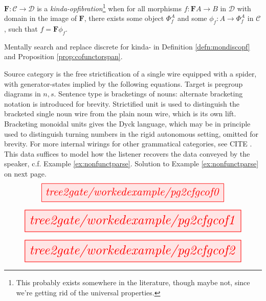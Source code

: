 \begin{defn}\label{defn:discopf}
$\mathbf{F}: \mathcal{C} \rightarrow \mathcal{D}$ is a \emph{kinda-opfibration}\footnote{This probably exists somewhere in the literature, though maybe not, since we're getting rid of the universal properties.} when for all morphisms $f: \mathbf{F}A \rightarrow B$ in $\mathcal{D}$ with domain in the image of $\mathbf{F}$, there exists some object $\Phi^A_f$ and some $\phi_f: A \rightarrow \Phi^A_f$ in $\mathcal{C}$, such that $f = \mathbf{F}\phi_f$.
\end{defn}

\begin{defn}
Mentally search and replace discrete for kinda- in Definition \ref{defn:mondiscopf} and Proposition \ref{prop:cofunctorspan}.
\end{defn}

\clearpage
\newpage

\begin{myboxR}
\begin{example}\label{ex:bigexlift}
\end{example}
Source category is the free strictification of a single wire equipped with a spider, with generator-states implied by the following equations. Target is pregroup diagrams in $n,s$. Sentence type is bracketings of nouns: alternate bracketing notation is introduced for brevity. Strictified unit is used to distinguish the bracketed single noun wire from the plain noun wire, which is its own lift. Bracketing monoidal units gives the Dyck language, which may be in principle used to distinguish turning numbers in the rigid autonomous setting, omitted for brevity. For more internal wirings for other grammatical categories, see \bR CITE \e. This data suffices to model how the listener recovers the data conveyed by the speaker, c.f. Example \ref{ex:nonfunctparse}. Solution to Example \ref{ex:nonfunctparse} on next page.
\[\resizebox{0.8\textwidth}{!}{\tikzfig{tree2gate/workedexample/pg2cfgcof0}}\]
\end{myboxR}

\begin{myboxB}
\[\resizebox{0.95\textwidth}{!}{\tikzfig{tree2gate/workedexample/pg2cfgcof1}}\]
\end{myboxB}

\begin{myboxB}
\[\resizebox{0.95\textwidth}{!}{\tikzfig{tree2gate/workedexample/pg2cfgcof2}}\]
\end{myboxB}

